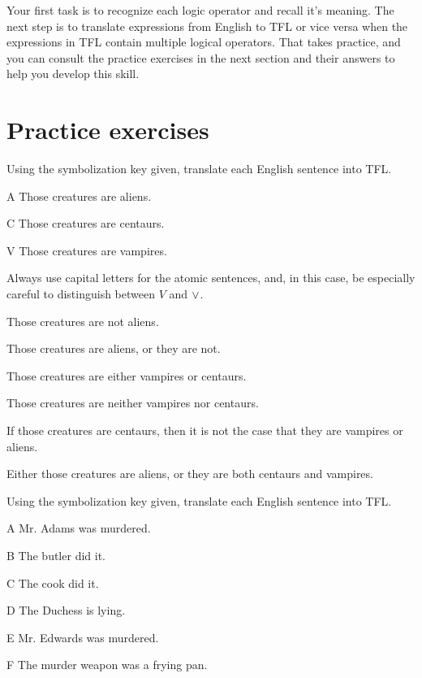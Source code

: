 \noindent Your first task is to recognize each logic operator and recall it's meaning. The next step is to translate expressions from English to TFL or vice versa when the expressions in TFL contain multiple logical operators. That takes practice, and you can consult the practice exercises in the next section and their answers to help you develop this skill.






\filbreak
\section{Practice exercises}
\setcounter{ProbPart}{0}

\problempart Using the symbolization key given, translate each English sentence into TFL.\label{pr.monkeysuits}
	\begin{ekey}
		\item[A] Those creatures are aliens. 
		\item[C] Those creatures are centaurs. 
		\item[V] Those creatures are vampires.
	\end{ekey}
Always use capital letters for the atomic sentences, and, in this case, be especially careful to distinguish between $V$ and $\vee$.

\begin{earg}
\item Those creatures are not aliens.
\item Those creatures are aliens, or they are not.
\item Those creatures are either vampires or centaurs.
\item Those creatures are neither vampires nor centaurs.
\item If those creatures are centaurs, then it is not the case that they are vampires or aliens.
\item Either those creatures are aliens, or they are both centaurs and vampires.
\end{earg}

\problempart Using the symbolization key given, translate each English sentence into TFL.
\begin{ekey}
\item[A] Mr. Adams was murdered.
\item[B] The butler did it.
\item[C] The cook did it.
\item[D] The Duchess is lying.
\item[E] Mr. Edwards was murdered.
\item[F] The murder weapon was a frying pan.
\end{ekey}

